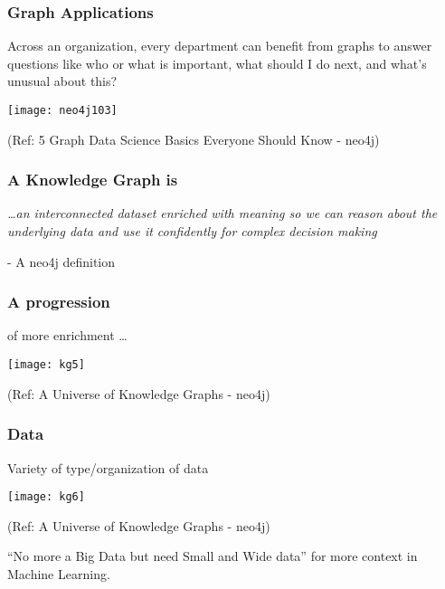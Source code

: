\begin{frame}\frametitle{ Graph Applications }

Across an organization, every department can benefit from graphs to answer questions 
like who or what is important, what should I do next, and what’s unusual about this?

\begin{center}
\texttt{[image: neo4j103]}
\end{center}	  


{\tiny (Ref: 5 Graph Data Science Basics Everyone Should Know - neo4j)}
\end{frame}

\begin{frame}[fragile]\frametitle{A Knowledge Graph is}
 
\begin{center}
{\em \ldots an interconnected dataset enriched with meaning so we can reason about the underlying data and use it confidently for complex decision making}
\end{center}

	  - A neo4j definition
		
\end{frame}


\begin{frame}[fragile]\frametitle{A progression}
 
 of more enrichment \ldots
 
			\begin{center}
			\texttt{[image: kg5]}
			\end{center}	
			
			{\tiny (Ref: A Universe of Knowledge Graphs - neo4j)}
		
\end{frame}

\begin{frame}[fragile]\frametitle{Data}
 
 Variety of type/organization of data
 
			\begin{center}
			\texttt{[image: kg6]}
			\end{center}	
			
			{\tiny (Ref: A Universe of Knowledge Graphs - neo4j)}
		
		
		``No more a Big Data but need Small and Wide data'' for more context in Machine Learning.
		
\end{frame}

